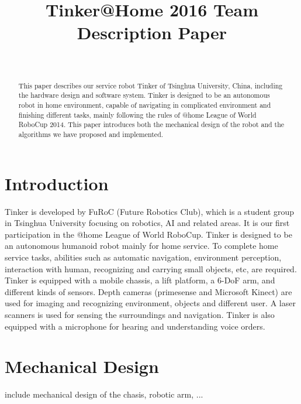 \documentclass[journal,12pt,onecolumn]{IEEEtran}
\begin{document}
	
\title{Tinker@Home 2016 Team Description Paper}
\author{\\
}
\maketitle


\begin{abstract}
This paper describes our service robot Tinker of Tsinghua University, China, including the hardware design and software system. Tinker is designed to be an autonomous robot in home environment, capable of navigating in complicated environment and finishing different tasks, mainly following the rules of @home League of World RoboCup 2014. This paper introduces both the mechanical design of the robot and the algorithms we have proposed and implemented.
\end{abstract}



\section{Introduction}
Tinker is developed by FuRoC (Future Robotics Club), which is a student group in Tsinghua University focusing on robotics, AI and related areas. It is our first participation in the @home League of World RoboCup. Tinker is designed to be an autonomous humanoid robot mainly for home service. To complete home service tasks, abilities such as automatic navigation, environment perception, interaction with human, recognizing and carrying small objects, etc, are required. Tinker is equipped with a mobile chassis, a lift platform, a 6-DoF arm, and different kinds of sensors. Depth cameras (primesense and Microsoft Kinect) are used for imaging and recognizing environment, objects and different user. A laser scanners is used for sensing the surroundings and navigation. Tinker is also equipped with a microphone for hearing and understanding voice orders.


\section{Mechanical Design}
include mechanical design of the chasis, robotic arm, ...



\end{document}
